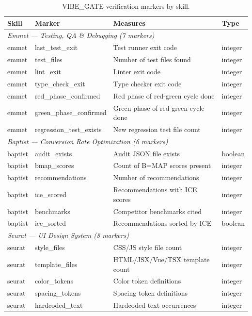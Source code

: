 \begin{table}[h]
\centering
\caption{VIBE\_GATE verification markers by skill.}
\label{tab:gate-markers}
\small
\begin{tabular}{llll}
\toprule
Skill & Marker & Measures & Type \\
\midrule
\multicolumn{4}{l}{\textit{Emmet --- Testing, QA \& Debugging (7 markers)}} \\
emmet & last\_test\_exit & Test runner exit code & integer \\
emmet & test\_files & Number of test files found & integer \\
emmet & lint\_exit & Linter exit code & integer \\
emmet & type\_check\_exit & Type checker exit code & integer \\
emmet & red\_phase\_confirmed & Red phase of red-green cycle done & integer \\
emmet & green\_phase\_confirmed & Green phase of red-green cycle done & integer \\
emmet & regression\_test\_exists & New regression test file count & integer \\
\midrule
\multicolumn{4}{l}{\textit{Baptist --- Conversion Rate Optimization (6 markers)}} \\
baptist & audit\_exists & Audit JSON file exists & boolean \\
baptist & bmap\_scores & Count of B=MAP scores present & integer \\
baptist & recommendations & Number of recommendations & integer \\
baptist & ice\_scored & Recommendations with ICE scores & integer \\
baptist & benchmarks & Competitor benchmarks cited & integer \\
baptist & ice\_sorted & Recommendations sorted by ICE & boolean \\
\midrule
\multicolumn{4}{l}{\textit{Seurat --- UI Design System (8 markers)}} \\
seurat & style\_files & CSS/JS style file count & integer \\
seurat & template\_files & HTML/JSX/Vue/TSX template count & integer \\
seurat & color\_tokens & Color token definitions & integer \\
seurat & spacing\_tokens & Spacing token definitions & integer \\
seurat & hardcoded\_text & Hardcoded text occurrences & integer \\

\end{tabular}
\end{table}
